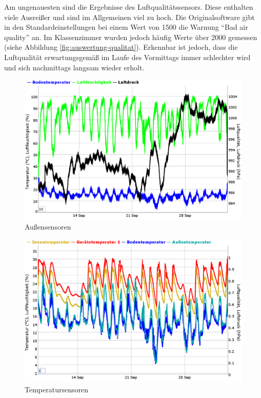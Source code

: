 Am ungenauesten sind die Ergebnisse des Luftqualitätssensors. Diese enthalten viele Ausreißer und sind im Allgemeinen viel zu hoch. Die Originalsoftware gibt in den Standardeinstellungen bei einem Wert von 1500 die Warnung \enquote{Bad air quality} an. Im Klassenzimmer wurden jedoch häufig Werte über 2000 gemessen (siehe Abbildung \ref{fig:auswertung-qualitat}). Erkennbar ist jedoch, dass die Luftqualität erwartungsgemäß im Laufe des Vormittags immer  schlechter wird und sich nachmittags langsam wieder erholt. 

\begin{figure}[p]
  \centering
     \includegraphics[width=0.95\textheight, angle=90]{figures/auswertung-aussen.png}
  \caption{Außensensoren}
  \label{fig:auswertung-aussen}
\end{figure}

\begin{figure}[p]
  \centering
     \includegraphics[width=0.95\textheight, angle=90]{figures/auswertung-temperaturen.png}
  \caption{Temperatursensoren}
  \label{fig:auswertung-temperaturen}
\end{figure}

